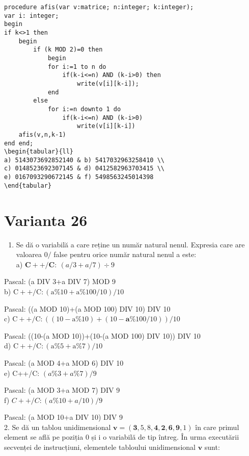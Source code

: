 \begin{verbatim}
procedure afis(var v:matrice; n:integer; k:integer);
var i: integer;
begin
if k<>1 then
    begin
        if (k MOD 2)=0 then
            begin
            for i:=1 to n do
                if(k-i<=n) AND (k-i>0) then
                    write(v[i][k-i]);
            end
        else
            for i:=n downto 1 do
                if(k-i<=n) AND (k-i>0)
                    write(v[i][k-i])
    afis(v,n,k-1)
end end;
\begin{tabular}{ll} 
a) 5143073692852140 & b) 5417032963258410 \\
c) 0148523692307145 & d) 0412582963703415 \\
e) 0167093290672145 & f) 5498563245014398
\end{tabular}
\end{verbatim}

\section*{Varianta 26}
\begin{enumerate}
  \item Se dă o variabilă a care reține un număr natural nenul. Expresia care are valoarea $0 /$ false pentru orice număr natural nenul a este:\\
a) $\mathbf{C + + / C : ~}(a / 3+a / 7) \div 9$
\end{enumerate}

Pascal: (a DIV 3+a DIV 7) MOD 9\\
b) $\mathrm{C}++/ \mathrm{C}:(\mathrm{a} \% 10+\mathrm{a} \% 100 / 10) / 10$

Pascal: ((a MOD 10)+(a MOD 100) DIV 10) DIV 10\\
c) $\mathrm{C}++/ \mathrm{C}:((10-\mathrm{a} \% 10)+(10-\mathbf{a} \% 100 / 10)) / 10$

Pascal: ((10-(a MOD 10))+(10-(a MOD 100) DIV 10)) DIV 10\\
d) $\mathrm{C}++/ \mathrm{C}:(\mathrm{a} \% 5+\mathrm{a} \% 7) / 10$

Pascal: (a MOD 4+a MOD 6) DIV 10\\
e) C++/C: $(a \% 3+a \% 7) / 9$

Pascal: (a MOD 3+a MOD 7) DIV 9\\
f) $C++/ C:(a \% 10+a / 10) / 9$

Pascal: (a MOD 10+a DIV 10) DIV 9\\
2. Se dă un tablou unidimensional $\mathbf{v}=(\mathbf{3}, 5,8, \mathbf{4}, \mathbf{2}, \mathbf{6}, \mathbf{9}, 1)$ în care primul element se află pe poziția 0 și i o variabilă de tip întreg. În urma executării secvenței de instrucțiuni, elementele tabloului unidimensional $\mathbf{v}$ sunt:

